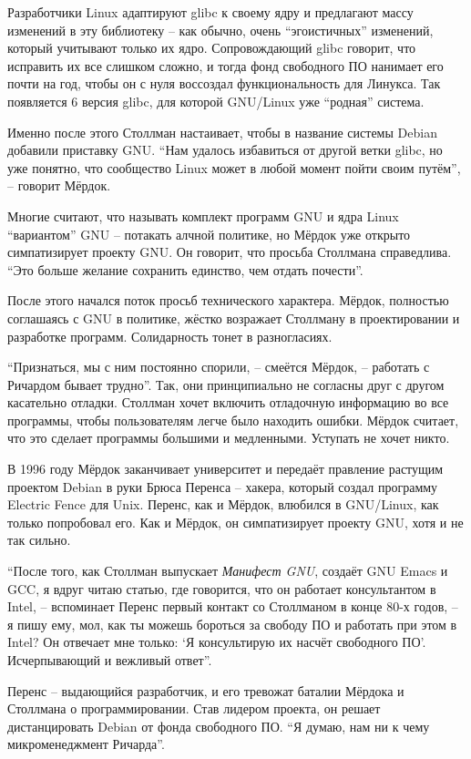 Разработчики Linux адаптируют glibc к своему ядру и предлагают массу изменений в эту библиотеку -- как обычно, очень ``эгоистичных'' изменений, который учитывают только их ядро. Сопровождающий glibc говорит, что исправить их все слишком сложно, и тогда фонд свободного ПО нанимает его почти на год, чтобы он с нуля воссоздал функциональность для Линукса. Так появляется 6 версия glibc, для которой GNU/Linux уже ``родная'' система.

Именно после этого Столлман настаивает, чтобы в название системы Debian добавили приставку GNU. ``Нам удалось избавиться от другой ветки glibc, но уже понятно, что сообщество Linux может в любой момент пойти своим путём'', -- говорит Мёрдок.

Многие считают, что называть комплект программ GNU и ядра Linux ``вариантом'' GNU -- потакать алчной политике, но Мёрдок уже открыто симпатизирует проекту GNU. Он говорит, что просьба Столлмана справедлива. ``Это больше желание сохранить единство, чем отдать почести''.

После этого начался поток просьб технического характера. Мёрдок, полностью соглашаясь с GNU в политике, жёстко возражает Столлману в проектировании и разработке программ. Солидарность тонет в разногласиях.

``Признаться, мы с ним постоянно спорили, -- смеётся Мёрдок, -- работать с Ричардом бывает трудно''. Так, они принципиально не согласны друг с другом касательно отладки. Столлман хочет включить отладочную информацию во все программы, чтобы пользователям легче было находить ошибки. Мёрдок считает, что это сделает программы большими и медленными. Уступать не хочет никто.

В 1996 году Мёрдок заканчивает университет и передаёт правление растущим проектом Debian в руки Брюса Перенса -- хакера, который создал программу Electric Fence для Unix. Перенс, как и Мёрдок, влюбился в GNU/Linux, как только попробовал его. Как и Мёрдок, он симпатизирует проекту GNU, хотя и не так сильно.

``После того, как Столлман выпускает \textit{Манифест GNU}, создаёт GNU Emacs и GCC, я вдруг читаю статью, где говорится, что он работает консультантом в Intel, -- вспоминает Перенс первый контакт со Столлманом в конце 80-х годов, -- я пишу ему, мол, как ты можешь бороться за свободу ПО и работать при этом в Intel? Он отвечает мне только: `Я консультирую их насчёт свободного ПО'. Исчерпывающий и вежливый ответ''.

Перенс -- выдающийся разработчик, и его тревожат баталии Мёрдока и Столлмана о программировании. Став лидером проекта, он решает дистанцировать Debian от фонда свободного ПО. ``Я думаю, нам ни к чему микроменеджмент Ричарда''.

